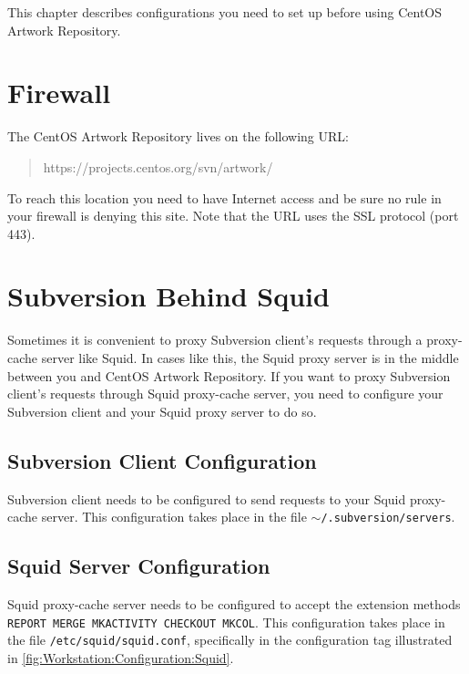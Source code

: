 
This chapter describes configurations you need to set up before using
CentOS Artwork Repository.

\section{Firewall}

The CentOS Artwork Repository lives on the following URL:

\begin{quote}
https://projects.centos.org/svn/artwork/
\end{quote}

To reach this location you need to have Internet access and be sure no
rule in your firewall is denying this site. Note that the URL uses the
SSL protocol (port 443).

\section{Subversion Behind Squid}

Sometimes it is convenient to proxy Subversion client's requests
through a proxy-cache server like Squid. In cases like this, the Squid
proxy server is in the middle between you and CentOS Artwork
Repository. If you want to proxy Subversion client's requests through
Squid proxy-cache server, you need to configure your Subversion client
and your Squid proxy server to do so.

\subsection{Subversion Client Configuration}

Subversion client needs to be configured to send requests to your
Squid proxy-cache server. This configuration takes place in the file
\texttt{$\sim$/.subversion/servers}.

\subsection{Squid Server Configuration}

Squid proxy-cache server needs to be configured to accept the
extension methods \texttt{REPORT MERGE MKACTIVITY CHECKOUT MKCOL}.
This configuration takes place in the file
\texttt{/etc/squid/squid.conf}, specifically in the configuration tag
illustrated in \autoref{fig:Workstation:Configuration:Squid}.

